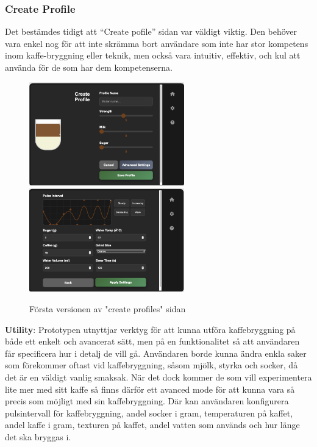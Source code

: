 \subsubsection{Create Profile}
Det bestämdes tidigt att “Create pofile” sidan var väldigt viktig. Den behöver vara enkel nog för att inte skrämma bort användare som inte har stor kompetens inom kaffe-bryggning eller teknik, men också vara intuitiv, effektiv, och kul att använda för de som har dem kompetenserna. 

\begin{figure}[H]
    \centering
    \includegraphics[width=0.6\textwidth]{bilder/brew.png}
    \includegraphics[width=0.6\textwidth]{bilder/advancedshit.png}
    \caption{Första versionen av "create profiles" sidan}
    \label{fig:create_v1}
\end{figure}
\textbf{Utility}: Prototypen utnyttjar verktyg för att kunna utföra kaffebryggning på både ett enkelt och avancerat sätt, men på en funktionalitet så att användaren får specificera hur i detalj de vill gå. Användaren borde kunna ändra enkla saker som förekommer oftast vid kaffebryggning, såsom mjölk, styrka och socker, då det är en väldigt vanlig smaksak. När det dock kommer de som vill experimentera lite mer med sitt kaffe så finns därför ett avanced mode för att kunna vara så precis som möjligt med sin kaffebryggning. Där kan användaren konfigurera pulsintervall för kaffebryggning, andel socker i gram, temperaturen på kaffet, andel kaffe i gram, texturen på kaffet, andel vatten som används och hur länge det ska bryggas i.

